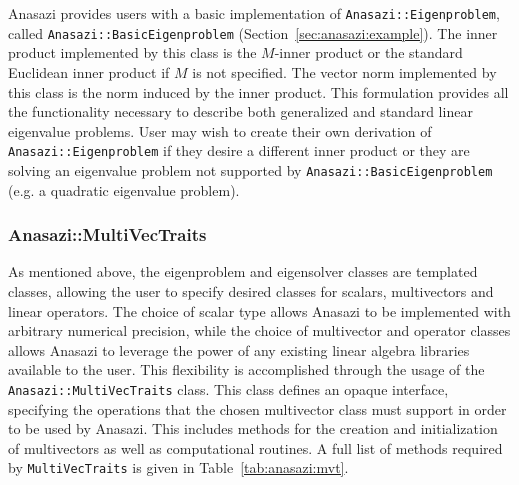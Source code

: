 Anasazi provides users with a basic implementation of
\verb!Anasazi::Eigenproblem!, called \verb!Anasazi::BasicEigenproblem!
(Section~\ref{sec:anasazi:example}).  The inner product implemented by this
class is the $M$-inner product or the standard Euclidean inner product if $M$
is not specified. The vector norm implemented by this class is the norm induced
by the inner product.  This formulation provides all the functionality
necessary to describe both generalized and standard linear eigenvalue problems.
User may wish to create their own derivation of \verb!Anasazi::Eigenproblem! if
they desire a different inner product or they are solving an eigenvalue problem
not supported by \verb!Anasazi::BasicEigenproblem! (e.g. a quadratic eigenvalue
problem).

\subsubsection{Anasazi::MultiVecTraits}
\label{sec:anasazi:mvt}

As mentioned above, the eigenproblem and eigensolver classes are templated
classes, allowing the user to specify desired classes for scalars, multivectors
and linear operators. The choice of scalar type allows Anasazi to be implemented
with arbitrary numerical precision, while the choice of multivector and operator
classes allows Anasazi to leverage the power of any existing linear algebra
libraries available to the user. This flexibility is accomplished through the
usage of the \verb!Anasazi::MultiVecTraits! class. This class defines an opaque
interface, specifying the operations that the chosen multivector class must
support in order to be used by Anasazi. This includes methods for the creation
and initialization of multivectors as well as computational routines. A full
list of methods required by \verb!MultiVecTraits! is given in
Table~\ref{tab:anasazi:mvt}.

